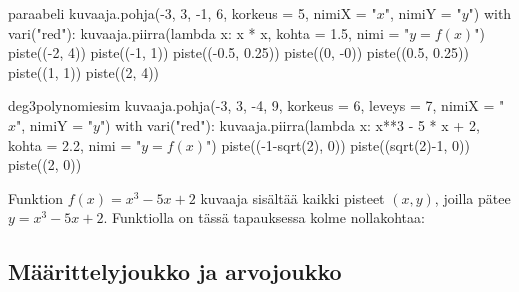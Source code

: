 \begin{luoKuva}{paraabeli}
    kuvaaja.pohja(-3, 3, -1, 6, korkeus = 5, nimiX = "$x$", nimiY = "$y$")
    with vari("red"): kuvaaja.piirra(lambda x: x * x, kohta = 1.5, nimi = "$y = f(x)$")
    piste((-2, 4))
    piste((-1, 1))
    piste((-0.5, 0.25))
    piste((0, -0))
    piste((0.5, 0.25))
    piste((1, 1))
    piste((2, 4))
\end{luoKuva}

\begin{luoKuva}{deg3polynomiesim}
    kuvaaja.pohja(-3, 3, -4, 9, korkeus = 6, leveys = 7, nimiX = "$x$", nimiY = "$y$")
    with vari("red"): kuvaaja.piirra(lambda x: x**3 - 5 * x + 2, kohta = 2.2, nimi = "$y = f(x)$")
    piste((-1-sqrt(2), 0))
    piste((sqrt(2)-1, 0))
    piste((2, 0))
\end{luoKuva}
\begin{esimerkki}
	Funktion $f(x) = x^3-5x+2$ kuvaaja sisältää kaikki pisteet $(x, y)$, joilla pätee $y = x^3-5x+2$. Funktiolla on tässä tapauksessa kolme nollakohtaa:
	\begin{center}
	\end{center}
\end{esimerkki}

\subsection*{Määrittelyjoukko ja arvojoukko}

